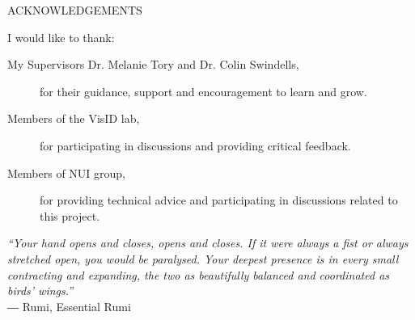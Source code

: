 \newpage
{}

\begin{center}
ACKNOWLEDGEMENTS
\end{center}

\noindent I would like to thank:
\begin{description}
\item[My Supervisors Dr. Melanie Tory and Dr. Colin Swindells,]
    for their guidance, support and encouragement to learn and grow.
\item[Members of the VisID lab,]
	for participating in discussions and providing critical feedback.
\item[Members of NUI group,]
    for providing technical advice and participating in discussions related to this project.
\end{description}

\vspace{4in}

\begin{flushright}
\textit{
``Your hand opens and closes, opens and closes. 
If it were always a fist or always stretched open, you would be paralysed. 
Your deepest presence is in every small contracting and expanding, the two as beautifully balanced and coordinated as birds' wings.''
}
\\
― Rumi, Essential Rumi \\
\end{flushright}
